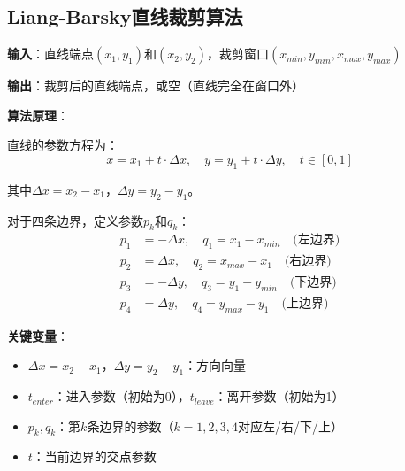 \documentclass[12pt,a4paper]{article}
\begin{document}
\begin{tcolorbox}
\subsection{Liang-Barsky直线裁剪算法}

\textbf{输入}：直线端点$(x_1, y_1)$和$(x_2, y_2)$，裁剪窗口$(x_{min}, y_{min}, x_{max}, y_{max})$

\textbf{输出}：裁剪后的直线端点，或空（直线完全在窗口外）

\textbf{算法原理}：

直线的参数方程为：
$$x = x_1 + t \cdot \Delta x, \quad y = y_1 + t \cdot \Delta y, \quad t \in [0, 1]$$

其中$\Delta x = x_2 - x_1$，$\Delta y = y_2 - y_1$。

对于四条边界，定义参数$p_k$和$q_k$：
\begin{align*}
p_1 &= -\Delta x, \quad q_1 = x_1 - x_{min} \quad \text{(左边界)} \\
p_2 &= \Delta x, \quad q_2 = x_{max} - x_1 \quad \text{(右边界)} \\
p_3 &= -\Delta y, \quad q_3 = y_1 - y_{min} \quad \text{(下边界)} \\
p_4 &= \Delta y, \quad q_4 = y_{max} - y_1 \quad \text{(上边界)}
\end{align*}

\textbf{关键变量}：
\begin{itemize}
    \item $\Delta x = x_2 - x_1$，$\Delta y = y_2 - y_1$：方向向量
    \item $t_{enter}$：进入参数（初始为0），$t_{leave}$：离开参数（初始为1）
    \item $p_k, q_k$：第$k$条边界的参数（$k=1,2,3,4$对应左/右/下/上）
    \item $t$：当前边界的交点参数
\end{itemize}


\end{tcolorbox}
\end{document}
